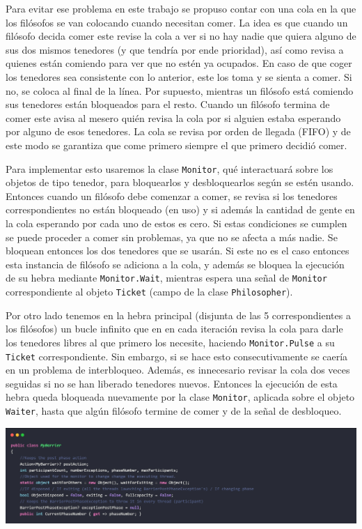 \documentclass[10pt]{article} %
\newcommand{\csl}[1]{\colorbox{backcolour}{\texttt{#1}}}
\begin{document}
Para evitar ese problema en este trabajo se propuso contar con una cola en la que los fil\'osofos se van colocando cuando necesitan comer. La idea es que cuando un fil\'osofo decida comer este revise la cola a ver si no hay nadie que quiera alguno de sus dos mismos tenedores (y que tendr\'ia por ende prioridad), as\'i como revisa a quienes est\'an comiendo para ver que no est\'en ya ocupados. En caso de que coger los tenedores sea consistente con lo anterior, este los toma y se sienta a comer. Si no, se coloca al final de la l\'inea. Por supuesto, mientras un fil\'osofo est\'a comiendo sus tenedores est\'an bloqueados para el resto. Cuando un fil\'osofo termina de comer este avisa al mesero qui\'en revisa la cola por si alguien estaba esperando por alguno de esos tenedores. La cola se revisa por orden de llegada (FIFO) y de este modo se garantiza que come primero siempre el que primero decidi\'o comer.\

Para implementar esto usaremos la clase \csl{Monitor}, qu\'e interactuar\'a sobre los objetos de tipo tenedor, para bloquearlos y desbloquearlos seg\'un se est\'en usando. Entonces cuando un fil\'osofo debe comenzar a comer, se revisa si los tenedores correspondientes no est\'an bloqueado (en uso) y si adem\'as la cantidad de gente en la cola esperando por cada uno de estos es cero. Si estas condiciones se cumplen se puede proceder a comer sin problemas, ya que no se afecta a m\'as nadie. Se bloquean entonces los dos tenedores que se usar\'an. Si este no es el caso entonces esta instancia de fil\'osofo se adiciona a la cola, y adem\'as se bloquea la ejecuci\'on de su hebra mediante \csl{Monitor.Wait}, mientras espera una se\~nal de \csl{Monitor} correspondiente al objeto \csl{Ticket} (campo de la clase \csl{Philosopher}).

Por otro lado tenemos en la hebra principal (disjunta de las 5 correspondientes a los fil\'osofos) un bucle infinito que en en cada iteraci\'on revisa la cola para darle los tenedores libres al que primero los necesite, haciendo \csl{Monitor.Pulse} a su \csl{Ticket} correspondiente. Sin embargo, si se hace esto consecutivamente se caer\'ia en un problema de interbloqueo. Adem\'as, es innecesario revisar la cola dos veces seguidas si no se han liberado tenedores nuevos. Entonces la ejecuci\'on de esta hebra queda bloqueada nuevamente por la clase \csl{Monitor}, aplicada sobre el objeto \csl{Waiter}, hasta que alg\'un fil\'osofo termine de comer y de la se\~nal de desbloqueo.

\begin{center}
	\includegraphics[width=15cm]{Philosopher_Live1.jpg}
\end{center}
\end{document}
